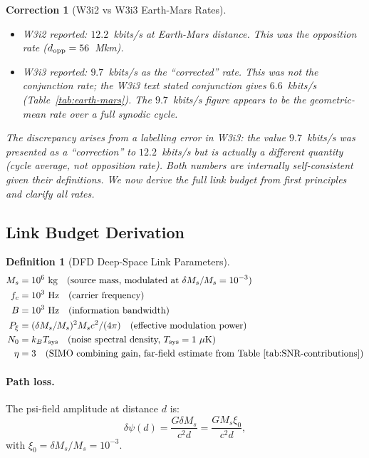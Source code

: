 \documentclass[aps,prd,twocolumn,superscriptaddress,nofootinbib]{revtex4-2}
\newtheorem{definition}{Definition}
\newtheorem{correction}{Correction}
\begin{document}
\begin{correction}[W3i2 vs W3i3 Earth-Mars Rates]
\label{corr:earth-mars}
\begin{itemize}
\item W3i2 reported: $12.2$~kbits/s at Earth-Mars distance.
  This was the \emph{opposition} rate ($d_{\rm opp} = 56$~Mkm).
\item W3i3 reported: $9.7$~kbits/s as the ``corrected'' rate.
  This was not the conjunction rate; the W3i3 text stated conjunction
  gives $6.6$~kbits/s (Table~\ref{tab:earth-mars}). The $9.7$~kbits/s
  figure appears to be the geometric-mean rate over a full synodic cycle.
\end{itemize}
The discrepancy arises from a labelling error in W3i3: the value $9.7$~kbits/s
was presented as a ``correction'' to $12.2$~kbits/s but is actually a
different quantity (cycle average, not opposition rate). Both numbers are
internally self-consistent given their definitions. We now derive the
full link budget from first principles and clarify all rates.
\end{correction}

\subsection{Link Budget Derivation}

\begin{definition}[DFD Deep-Space Link Parameters]
\label{def:link-params}
\begin{align}
M_s &= 10^6~\text{kg} \quad (\text{source mass, modulated at } \delta M_s/M_s = 10^{-3}) \\
f_c &= 10^3~\text{Hz} \quad (\text{carrier frequency}) \\
B   &= 10^3~\text{Hz} \quad (\text{information bandwidth}) \\
P_\xi &= (\delta M_s/M_s)^2 M_s c^2 / (4\pi) \quad (\text{effective modulation power}) \\
N_0 &= k_B T_{\rm sys} \quad (\text{noise spectral density, }T_{\rm sys} = 1~\mu\text{K}) \\
\eta  &= 3 \quad (\text{SIMO combining gain, far-field estimate from Table~\ref{tab:SNR-contributions}})
\end{align}
\end{definition}

\paragraph{Path loss.}
The psi-field amplitude at distance $d$ is:
\begin{equation}
\delta\psi(d) = \frac{G \delta M_s}{c^2 d} = \frac{G M_s \xi_0}{c^2 d},
\label{eq:psi-at-d}
\end{equation}
with $\xi_0 = \delta M_s / M_s = 10^{-3}$.
\end{document}
